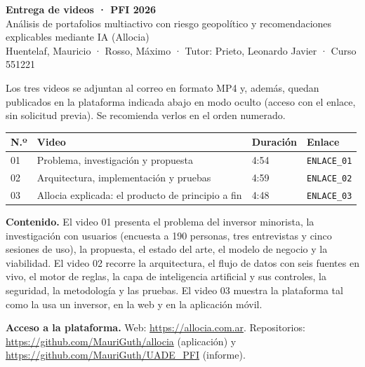 \documentclass[a4paper,11pt]{article}
\begin{document}
\begin{center}{\LARGE\bfseries Entrega de videos · PFI 2026}\\[4pt]
{\large Análisis de portafolios multiactivo con riesgo geopolítico y recomendaciones explicables mediante IA (Allocia)}\\[4pt]
Huentelaf, Mauricio · Rosso, Máximo · Tutor: Prieto, Leonardo Javier · Curso 551221\end{center}

Los tres videos se adjuntan al correo en formato MP4 y, además, quedan publicados en la plataforma indicada abajo en modo oculto (acceso con el enlace, sin solicitud previa). Se recomienda verlos en el orden numerado.

\begin{tabular}{p{0.6cm}p{6.2cm}p{1.6cm}p{6.6cm}}\toprule
\textbf{N.º} & \textbf{Video} & \textbf{Duración} & \textbf{Enlace}\\\midrule
01 & Problema, investigación y propuesta & 4:54 & \texttt{ENLACE\_01}\\
02 & Arquitectura, implementación y pruebas & 4:59 & \texttt{ENLACE\_02}\\
03 & Allocia explicada: el producto de principio a fin & 4:48 & \texttt{ENLACE\_03}\\\bottomrule
\end{tabular}

\textbf{Contenido.} El video 01 presenta el problema del inversor minorista, la investigación con usuarios (encuesta a 190 personas, tres entrevistas y cinco sesiones de uso), la propuesta, el estado del arte, el modelo de negocio y la viabilidad. El video 02 recorre la arquitectura, el flujo de datos con seis fuentes en vivo, el motor de reglas, la capa de inteligencia artificial y sus controles, la seguridad, la metodología y las pruebas. El video 03 muestra la plataforma tal como la usa un inversor, en la web y en la aplicación móvil.

\textbf{Acceso a la plataforma.} Web: \url{https://allocia.com.ar}. Repositorios: \url{https://github.com/MauriGuth/allocia} (aplicación) y \url{https://github.com/MauriGuth/UADE_PFI} (informe).
\end{document}
